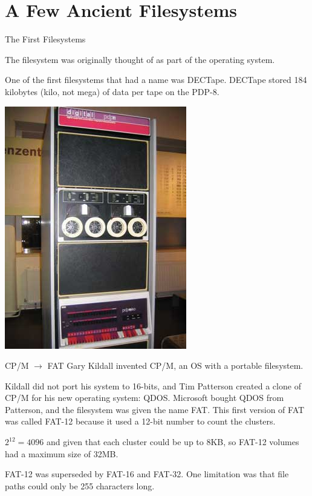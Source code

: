 \documentclass{lug}
\newcommand{\splitslide}[4]{
    \noindent
    \begin{minipage}{#1 \textwidth - #2 }
        #3
    \end{minipage}%
    \hspace{ \dimexpr #2 * 2 \relax }%
    \begin{minipage}{\textwidth - #1 \textwidth - #2 }
        #4
    \end{minipage}
}
\begin{document}
\section{A Few Ancient Filesystems}
\begin{frame}{The First Filesystems}
    \splitslide{0.60}{1em}{
        The filesystem was originally thought of as part of the operating
        system.

        One of the first filesystems that had a name was DECTape. DECTape stored
        184 kilobytes (kilo, not mega) of data per tape on the PDP-8.
    }{\includegraphics[width=0.4\textheight]{./graphics/dectape.jpg}}
\end{frame}

\begin{frame}{CP/M $\rightarrow$ FAT}
    Gary Kildall invented CP/M, an OS with a portable filesystem.

    Kildall did not port his system to 16-bits, and Tim Patterson created a
    clone of CP/M for his new operating system: QDOS. Microsoft bought QDOS from
    Patterson, and the filesystem was given the name FAT. This first version of
    FAT was called FAT-12 because it used a 12-bit number to count the clusters.

    $2^{12} = 4096$ and given that each cluster could be up to 8KB, so FAT-12
    volumes had a maximum size of 32MB.

    FAT-12 was superseded by FAT-16 and FAT-32. One limitation was that file
    paths could only be 255 characters long.
\end{frame}
\end{document}
